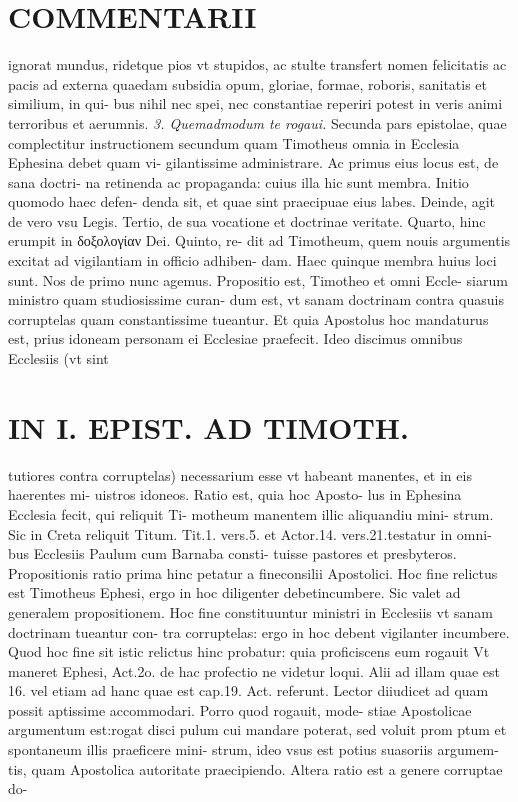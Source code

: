 \documentclass{article}
\begin{document}
\begin{pages}
\section*{COMMENTARII }\pstart ignorat mundus, ridetque pios vt stupidos, ac stulte transfert nomen felicitatis ac pacis ad externa quaedam subsidia opum, gloriae, formae, roboris, sanitatis et similium, in qui- bus nihil nec spei, nec constantiae reperiri potest in veris animi terroribus et aerumnis.  \pend
\textit{3. Quemadmodum te rogaui. }\pstart Secunda pars epistolae, quae complectitur instructionem secundum quam Timotheus omnia in Ecclesia Ephesina debet quam vi- gilantissime administrare.  \pend\pstart Ac primus eius locus est, de sana doctri- na retinenda ac propaganda: cuius illa hic sunt membra. Initio quomodo haec defen- denda sit, et quae sint praecipuae eius labes. Deinde, agit de vero vsu Legis. Tertio, de sua vocatione et doctrinae veritate. Quarto, hinc erumpit in δοξολογίαν Dei. Quinto, re- dit ad Timotheum, quem nouis argumentis excitat ad vigilantiam in officio adhiben- dam. Haec quinque membra huius loci sunt. Nos de primo nunc agemus.  \pend\pstart Propositio est, Timotheo et omni Eccle- siarum ministro quam studiosissime curan- dum est, vt sanam doctrinam contra quasuis corruptelas quam constantissime tueantur. Et quia Apostolus hoc mandaturus est, prius idoneam personam ei Ecclesiae praefecit. Ideo discimus omnibus Ecclesiis (vt sint  \pend
\section*{IN I. EPIST. AD TIMOTH. }
\marginpar{[ p.17 ]}\pstart tutiores contra corruptelas) necessarium esse vt habeant manentes, et in eis haerentes mi- uistros idoneos. Ratio est, quia hoc Aposto- lus in Ephesina Ecclesia fecit, qui reliquit Ti- motheum manentem illic aliquandiu mini- strum. Sic in Creta reliquit Titum. Tit.1. vers.5. et Actor.14. vers.21.testatur in omni- bus Ecclesiis Paulum cum Barnaba consti- tuisse pastores et presbyteros.  \pend\pstart Propositionis ratio prima hinc petatur a fineconsilii Apostolici. Hoc fine relictus est Timotheus Ephesi, ergo in hoc diligenter debetincumbere. Sic valet ad generalem propositionem. Hoc fine constituuntur ministri in Ecclesiis vt sanam doctrinam tueantur con- tra corruptelas: ergo in hoc debent vigilanter incumbere. Quod hoc fine sit istic relictus hinc probatur: quia proficiscens eum rogauit Vt maneret Ephesi, Act.2o. de hac profectio ne videtur loqui. Alii ad illam quae est 16. vel etiam ad hanc quae est cap.19. Act. referunt. Lector diiudicet ad quam possit aptissime accommodari. Porro quod rogauit, mode- stiae Apostolicae argumentum est:rogat disci pulum cui mandare poterat, sed voluit prom ptum et spontaneum illis praeficere mini- strum, ideo vsus est potius suasoriis argumem- tis, quam Apostolica autoritate praecipiendo. Altera ratio est a genere corruptae do-  \pend

\end{pages}
\end{document}

